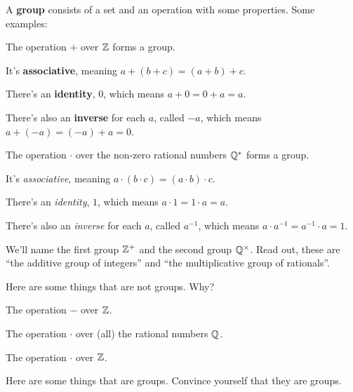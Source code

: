 \documentclass[11pt,paper=letter]{scrartcl}
\renewcommand{\bluebf}[1]{{\bfseries \color{Blue} #1}}
\begin{document}
A \bluebf{group} consists of a set and an operation with some properties. Some examples:

\begin{itemthin}
  \item The operation $+$ over $\mathbb Z$ forms a group.
  \begin{itemthin}
  \item It's \bluebf{associative}, meaning $a + (b + c) = (a + b) + c$.
  \item There's an \bluebf{identity}, $0$, which means $a + 0 = 0 + a = a$.
  \item There's also an \textbf{inverse} for each $a$, called $-a$, which means $a + (-a) = (-a) + a = 0$.
  \end{itemthin}
  \item The operation $\cdot$ over the non-zero rational numbers $\mathbb Q^*$ forms a group.
  \begin{itemthin}
  \item It's \textit{associative}, meaning $a \cdot (b \cdot c) = (a \cdot b) \cdot c$.
  \item There's an \textit{identity}, $1$, which means $a \cdot 1 = 1 \cdot a = a$.
  \item There's also an \textit{inverse} for each $a$, called $a^{-1}$, which means $a \cdot a^{-1} = a^{-1} \cdot a = 1$.
  \end{itemthin}
\end{itemthin}

We'll name the first group $\mathbb Z^+$ and the second group $ \mathbb Q^{\times} $. Read out, these are ``the additive group of integers'' and ``the multiplicative group of rationals''.

Here are some things that are not groups. Why?

\begin{itemthin}
  \item The operation $-$ over $\mathbb Z$.
  \item The operation $\cdot$ over (all) the rational numbers $\mathbb Q$.
  \item The operation $\cdot$ over $\mathbb Z$.
\end{itemthin}

Here are some things that are groups. Convince yourself that they are groups.
\end{document}

